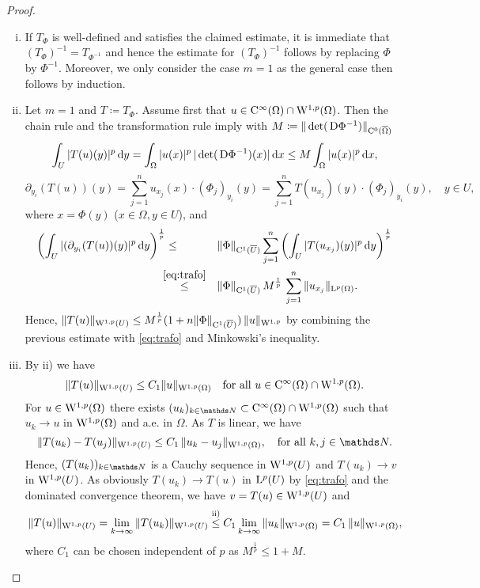 \begin{proof}
  \begin{enumerate}[i)]
    \item If $T_\Phi$ is well-defined and satisfies the claimed estimate, it is immediate that $(T_\Phi)^{-1} = T_{\Phi^{-1}}$ and hence the estimate for $(T_\Phi)^{-1}$ follows by replacing $\Phi$ by $\Phi^{-1}$.
      Moreover, we only consider the case $m = 1$ as the general case then follows by induction.
    \item Let $m = 1$ and $T \coloneqq T_\Phi$.
      Assume first that $u \in \mathrm{C}^\infty(\Omega) \cap \mathrm{W}^{1,p}(\Omega)$.
      Then the chain rule and the transformation rule imply with $M \coloneqq \|\det(\,{\operatorname{D}} \Phi^{-1})\|_{\mathrm{C}^0(\overline{\Omega})}$
  \begin{equation}
    \label{eq:trafo}
    \int_U |T(u)(y)|^p \, {\operatorname{d}\!{y}}
     = \int_\Omega |u(x)|^p \, |\det(\,{\operatorname{D}} \Phi^{-1})(x)| \, {\operatorname{d}\!{x}}
    \leq M \int_\Omega |u(x)|^p \, {\operatorname{d}\!{x}},
  \end{equation}
  $$
  \partial_{y_i} (T(u))(y)
  = \sum_{j = 1}^n u_{x_j}(x) \cdot (\Phi_j)_{y_i}(y)
  = \sum_{j = 1}^n T(u_{x_j})(y) \cdot (\Phi_j)_{y_i}(y), \quad y \in U,
  $$
  where $x = \Phi(y)$ ($x \in \Omega, y \in U$), and
      \begin{alignat*}{2}
    \left( \int_U |(\partial_{y_i}(T(u))(y)|^p \, {\operatorname{d}\!{y}}\right)^{\frac{1}{p}}
        & \leq &&\|\Phi\|_{\mathrm{C}^1(\overline U)} \sum_{j = 1}^n \left( \int_U |T(u_{x_j})(y)|^p \, {\operatorname{d}\!{y}} \right)^{\frac{1}{p}} \\
        & \hspace{-0.5em}\overset{\eqref{eq:trafo}}{\leq} &&\|\Phi\|_{\mathrm{C}^1(\overline U)} \, M^{\frac{1}{p}} \, \sum_{j = 1}^n \|u_{x_j} \|_{\mathrm{L}^p(\Omega)}.
      \end{alignat*}
  Hence, $\|T(u)\|_{\mathrm{W}^{1,p}(U)} \leq M^{\frac{1}{p}} (1 + n\|\Phi\|_{\mathrm{C}^1(\overline U)}) \, \|u\|_{\mathrm{W}^{1,p}}$ by combining the previous estimate with \eqref{eq:trafo} and Minkowski's inequality.
\item By ii) we have
  $$
  \|T(u)\|_{\mathrm{W}^{1,p}(U)} \leq C_1 \|u\|_{\mathrm{W}^{1,p}(\Omega)} \quad \text{for all } u \in \mathrm{C}^\infty(\Omega) \cap \mathrm{W}^{1,p}(\Omega).
  $$
  For $u \in \mathrm{W}^{1,p}(\Omega)$ there exists $(u_k)_{k \in \N} \subset \CC^\infty(\Omega) \cap \WW^{1,p}(\Omega)$ such that $u_k \to u$ in $\mathrm{W}^{1,p}(\Omega)$ and a.e. in $\Omega$.
  As $T$ is linear, we have
  $$
  \| T(u_k) - T(u_j)\|_{\WW^{1,p}(U)} \leq C_1 \, \|u_k - u_j\|_{\WW^{1,p}(\Omega)}, \quad\text{for all } k,j \in \N.
  $$
  Hence, $(T(u_k))_{k \in \N}$ is a Cauchy sequence in $\mathrm{W}^{1,p}(U)$ and $T(u_k) \to v$ in $\mathrm{W}^{1,p}(U)$.
  As obviously $T(u_k) \to T(u)$ in $\mathrm{L}^p(U)$ by \eqref{eq:trafo} and the dominated convergence theorem, we have $v = T(u) \in \mathrm{W}^{1,p}(U)$ and 
  $$
  \| T(u) \|_{\mathrm{W}^{1,p}(U)} 
  = \lim_{k \to \infty} \|T(u_k)\|_{\mathrm{W}^{1,p}(U)}
      \overset{\text{ii)}}\leq C_1 \lim_{k \to \infty} \|u_k\|_{\mathrm{W}^{1,p}(\Omega)}
  = C_1 \, \|u\|_{\mathrm{W}^{1,p}(\Omega)},
  $$
  where $C_1$ can be chosen independent of $p$ as $M^{\frac{1}{p}} \leq 1 + M$. \qedhere
  \end{enumerate}
\end{proof}

